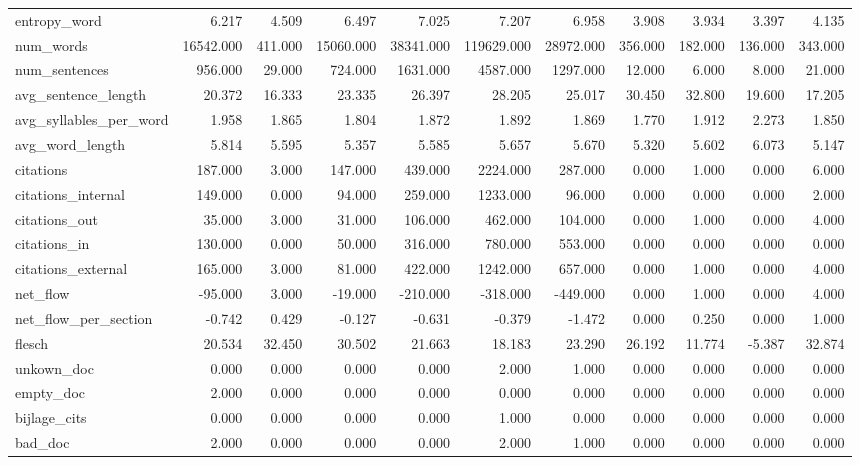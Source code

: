 \begin{tabular}{lrrrrrrrrrr}
\cline{1-11}
entropy\_word & 6.217 & 4.509 & 6.497 & 7.025 & 7.207 & 6.958 & 3.908 & 3.934 & 3.397 & 4.135 \\
\cline{1-11}
num\_words & 16542.000 & 411.000 & 15060.000 & 38341.000 & 119629.000 & 28972.000 & 356.000 & 182.000 & 136.000 & 343.000 \\
\cline{1-11}
num\_sentences & 956.000 & 29.000 & 724.000 & 1631.000 & 4587.000 & 1297.000 & 12.000 & 6.000 & 8.000 & 21.000 \\
\cline{1-11}
avg\_sentence\_length & 20.372 & 16.333 & 23.335 & 26.397 & 28.205 & 25.017 & 30.450 & 32.800 & 19.600 & 17.205 \\
\cline{1-11}
avg\_syllables\_per\_word & 1.958 & 1.865 & 1.804 & 1.872 & 1.892 & 1.869 & 1.770 & 1.912 & 2.273 & 1.850 \\
\cline{1-11}
avg\_word\_length & 5.814 & 5.595 & 5.357 & 5.585 & 5.657 & 5.670 & 5.320 & 5.602 & 6.073 & 5.147 \\
\cline{1-11}
citations & 187.000 & 3.000 & 147.000 & 439.000 & 2224.000 & 287.000 & 0.000 & 1.000 & 0.000 & 6.000 \\
\cline{1-11}
citations\_internal & 149.000 & 0.000 & 94.000 & 259.000 & 1233.000 & 96.000 & 0.000 & 0.000 & 0.000 & 2.000 \\
\cline{1-11}
citations\_out & 35.000 & 3.000 & 31.000 & 106.000 & 462.000 & 104.000 & 0.000 & 1.000 & 0.000 & 4.000 \\
\cline{1-11}
citations\_in & 130.000 & 0.000 & 50.000 & 316.000 & 780.000 & 553.000 & 0.000 & 0.000 & 0.000 & 0.000 \\
\cline{1-11}
citations\_external & 165.000 & 3.000 & 81.000 & 422.000 & 1242.000 & 657.000 & 0.000 & 1.000 & 0.000 & 4.000 \\
\cline{1-11}
net\_flow & -95.000 & 3.000 & -19.000 & -210.000 & -318.000 & -449.000 & 0.000 & 1.000 & 0.000 & 4.000 \\
\cline{1-11}
net\_flow\_per\_section & -0.742 & 0.429 & -0.127 & -0.631 & -0.379 & -1.472 & 0.000 & 0.250 & 0.000 & 1.000 \\
\cline{1-11}
flesch & 20.534 & 32.450 & 30.502 & 21.663 & 18.183 & 23.290 & 26.192 & 11.774 & -5.387 & 32.874 \\
\cline{1-11}
unkown\_doc & 0.000 & 0.000 & 0.000 & 0.000 & 2.000 & 1.000 & 0.000 & 0.000 & 0.000 & 0.000 \\
\cline{1-11}
empty\_doc & 2.000 & 0.000 & 0.000 & 0.000 & 0.000 & 0.000 & 0.000 & 0.000 & 0.000 & 0.000 \\
\cline{1-11}
bijlage\_cits & 0.000 & 0.000 & 0.000 & 0.000 & 1.000 & 0.000 & 0.000 & 0.000 & 0.000 & 0.000 \\
\cline{1-11}
bad\_doc & 2.000 & 0.000 & 0.000 & 0.000 & 2.000 & 1.000 & 0.000 & 0.000 & 0.000 & 0.000 \\
\cline{1-11}
\bottomrule
\end{tabular}
